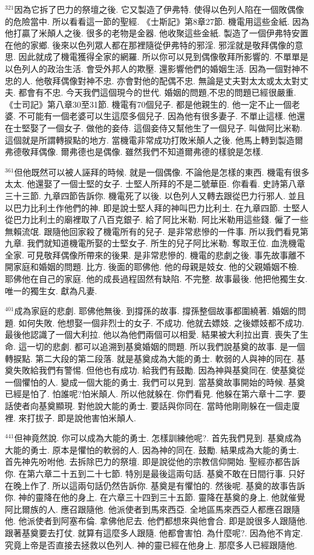 \documentclass{book}
\begin{document}
$^{321}$因為它拆了巴力的祭壇之後.
它又製造了伊弗特.
使得以色列人陷在一個敗偶像的危險當中.
所以看看這一節的聖經.
《士斯記》第8章27節.
機電用這些金紙.
因為他打贏了米顛人之後.
很多的老物是金器.
他收聚這些金紙.
製造了一個伊弗特安置在他的家鄉.
後來以色列眾人都在那裡隨從伊弗特的邪淫.
邪淫就是敬拜偶像的意思.
因此就成了機電獲得全家的網羅.
所以你可以見到偶像敬拜所影響的.
不單單是以色列人的政治生活.
會受外邦人的欺壓.
還影響他們的婚姻生活.
因為一個對神不忠的人.
他敬拜偶像對神不忠.
亦會對他的配偶不忠.
無論是丈夫對太太或太太對丈夫.
都會有不忠.
今天我們這個現今的世代.
婚姻的問題,不忠的問題已經很嚴重.
《士司記》第八章30至31節.
機電有70個兒子.
都是他親生的.
他一定不止一個老婆.
不可能有一個老婆可以生這麼多個兒子.
因為他有很多妻子.
不單止這樣.
他還在士堅娶了一個女子.
做他的妾侍.
這個妾侍又幫他生了一個兒子.
叫做阿比米勒.
這個就是所謂轉捩點的地方.
當機電非常成功打敗米顛人之後.
他馬上轉到製造爾弗德敬拜偶像.
爾弗德也是偶像.
雖然我們不知道爾弗德的樣貌是怎樣.

$^{361}$但他既然可以被人誣拜的時候.
就是一個偶像.
不論他是怎樣的東西.
機電有很多太太.
他還娶了一個士堅的女子.
士堅人所拜的不是二號華臣.
你看看.
史詩第八章三十三節.
九章四節告訴你.
機電死了以後.
以色列人又轉去跟從巴力行邪人.
並且以巴力比利土作他們的神.
即是說士堅人拜的神叫巴力比利土.
在九章四節.
士堅人從巴力比利土的廟裡取了八百克銀子.
給了阿比米勒.
阿比米勒用這些錢.
僱了一些無賴流氓.
跟隨他回家殺了機電所有的兒子.
是非常悲慘的一件事.
所以我們看見第九章.
我們就知道機電所娶的士堅女子.
所生的兒子阿比米勒.
奪取王位.
血洗機電全家.
可見敬拜偶像所帶來的後果.
是非常悲慘的.
機電的悲劇之後.
事先故事離不開家庭和婚姻的問題.
比方.
後面的耶佛他.
他的母親是妓女.
他的父親婚姻不檢.
耶佛他在自己的家庭.
他的成長過程固然有缺陷.
不完整.
故事最後.
他把他獨生女.
唯一的獨生女.
獻為凡妻.

$^{401}$成為家庭的悲劇.
耶佛他無後.
到撐孫的故事.
撐孫整個故事都圍繞著.
婚姻的問題.
如何失敗.
他想娶一個非烈士的女子.
不成功.
他就去嫖妓.
之後嫖妓都不成功.
最後他認識了一個大利拉.
他以為他們兩個可以相愛.
結果被大利拉出賣.
喪失了生命.
這一切的悲劇.
都可以追溯到基奠婚姻的問題.
所以我們說基奠的故事.
是一個轉捩點.
第二大段的第二段落.
就是基奠成為大能的勇士.
軟弱的人與神的同在.
基奠失敗給我們有警惕.
但他也有成功.
給我們有鼓勵.
因為神與基奠同在.
使基奠從一個懼怕的人.
變成一個大能的勇士.
我們可以見到.
當基奠故事開始的時候.
基奠已經是怕了.
怕誰呢?怕米顛人.
所以他就躲在.
你們看見.
他躲在第六章十二字.
要話使者向基奠顯現.
對他說大能的勇士.
要話與你同在.
當時他剛剛躲在一個走廈裡.
來打拔子.
即是說他害怕米顛人.

$^{441}$但神竟然說.
你可以成為大能的勇士.
怎樣訓練他呢?.
首先我們見到.
基奠成為大能的勇士.
原本是懼怕的軟弱的人.
因為神的同在.
鼓勵.
結果成為大能的勇士.
首先神先吩咐他.
去拆除巴力的祭壇.
即是說從他的宗教信仰開始.
聖經亦都告訴你.
在第六章二十五到二十七節.
特別是最後這兩句話.
基奠不敢在日間行事.
只好在晚上作了.
所以這兩句話仍然告訴你.
基奠是有懼怕的.
然後呢.
基奠的故事告訴你.
神的靈降在他的身上.
在六章三十四到三十五節.
靈降在基奠的身上.
他就催覺阿比爾族的人.
應召跟隨他.
他派使者到馬來西亞.
全地區馬來西亞人都應召跟隨他.
他派使者到阿塞布倫.
拿佛他尼去.
他們都想來與他會合.
即是說很多人跟隨他.
跟著基奠要去打仗.
就算有這麼多人跟隨.
他都會害怕.
為什麼呢?.
因為他不肯定.
究竟上帝是否直接去拯救以色列人.
神的靈已經在他身上.
那麼多人已經跟隨他.
\end{document}
